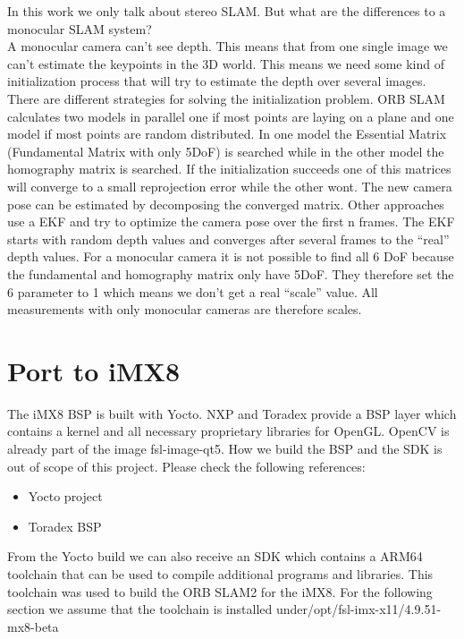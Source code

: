 \documentclass[11pt,a4paper,titlepage,oneside]{report}
\begin{document}
In this work we only talk about stereo SLAM. But what are the differences to a monocular SLAM system?\\
A monocular camera can't see depth. This means that from one single image we can't estimate the keypoints in the 3D world. This means we need some kind of initialization process that will try to estimate the depth over several images. There are different strategies for solving the initialization problem. ORB SLAM calculates two models in parallel one if most points are laying on a plane and one model if most points are random distributed. In one model the Essential Matrix (Fundamental Matrix with only 5DoF) is searched while in the other model the homography matrix is searched. If the initialization succeeds one of this matrices will converge to a small reprojection error while the other wont. The new camera pose can be estimated by decomposing the converged matrix. Other approaches use a EKF and try to optimize the camera pose over the first n frames. The EKF starts with random depth values and converges after several frames to the ``real'' depth values.  For a monocular camera it is not possible to find all 6 DoF because the fundamental and homography matrix only have 5DoF. They therefore set the 6 parameter to 1 which means we don't get a real ``scale'' value. All measurements with only monocular cameras are therefore scales.

\section{Port to iMX8}\label{sec:orbport}

The iMX8 BSP is built with Yocto. NXP and Toradex provide a BSP layer which contains a kernel and all necessary proprietary libraries for OpenGL. OpenCV is already part of the image fsl-image-qt5. How we build the BSP and the SDK is out of scope of this project. Please check the following references:\\
\begin{itemize}
	\item Yocto project \cite{yocto}
	\item Toradex BSP \cite{toradex_bsp}
\end{itemize}

From the Yocto build we can also receive an SDK which contains a ARM64 toolchain that can be used to compile additional programs and libraries. This toolchain was used to build the ORB SLAM2 for the iMX8. For the following section we assume that the toolchain is installed under/opt/fsl-imx-x11/4.9.51-mx8-beta
\end{document}
